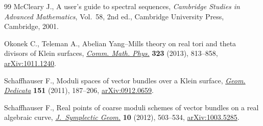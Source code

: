 \begin{thebibliography}{99}
McCleary J., A user's guide to spectral sequences, \textit{Cambridge Studies in
 Advanced Mathematics}, Vol.~58, 2nd ed., Cambridge University Press,
 Cambridge, 2001.

Okonek C., Teleman A., Abelian {Y}ang--{M}ills theory on real tori and theta
 divisors of {K}lein surfaces, \href{http://dx.doi.org/10.1007/s00220-013-1793-z}{\textit{Comm. Math. Phys.}} \textbf{323} (2013),
 813--858, \href{http://arxiv.org/abs/1011.1240}{arXiv:1011.1240}.

Schaf\/fhauser F., Moduli spaces of vector bundles over a {K}lein surface,
 \href{http://dx.doi.org/10.1007/s10711-010-9526-3}{\textit{Geom. Dedicata}} \textbf{151} (2011), 187--206, \href{http://arxiv.org/abs/0912.0659}{arXiv:0912.0659}.

Schaf\/fhauser F., Real points of coarse moduli schemes of vector bundles on a
 real algebraic curve, \href{http://dx.doi.org/10.4310/JSG.2012.v10.n4.a2}{\textit{J.~Symplectic Geom.}} \textbf{10} (2012),
 503--534, \href{http://arxiv.org/abs/1003.5285}{arXiv:1003.5285}.

\end{thebibliography}
